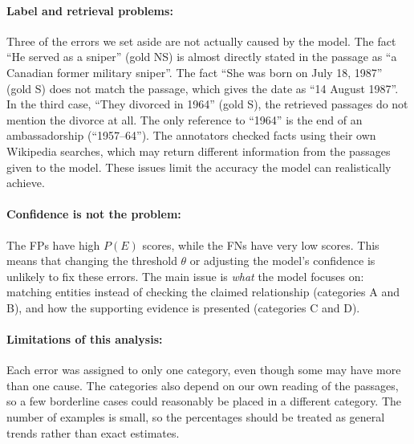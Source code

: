 \documentclass[12pt,a4paper]{article}
\begin{document}

\paragraph{Label and retrieval problems:} Three of the errors we set aside are not actually caused by the model. The fact ``He served as a sniper'' (gold NS) is almost directly stated in the passage as ``a Canadian former military sniper''. The fact ``She was born on July 18, 1987'' (gold S) does not match the passage, which gives the date as ``14 August 1987''. In the third case, ``They divorced in 1964'' (gold S), the retrieved passages do not mention the divorce at all. The only reference to ``1964'' is the end of an ambassadorship (``1957--64''). The annotators checked facts using their own Wikipedia searches, which may return different information from the passages given to the model. These issues limit the accuracy the model can realistically achieve.

\paragraph{Confidence is not the problem:} The FPs have high $P(E)$ scores, while the FNs have very low scores. This means that changing the threshold $\theta$ or adjusting the model's confidence is unlikely to fix these errors. The main issue is \emph{what} the model focuses on: matching entities instead of checking the claimed relationship (categories A and B), and how the supporting evidence is presented (categories C and D).

\paragraph{Limitations of this analysis:} Each error was assigned to only one category, even though some may have more than one cause. The categories also depend on our own reading of the passages, so a few borderline cases could reasonably be placed in a different category. The number of examples is small, so the percentages should be treated as general trends rather than exact estimates.
\end{document}
